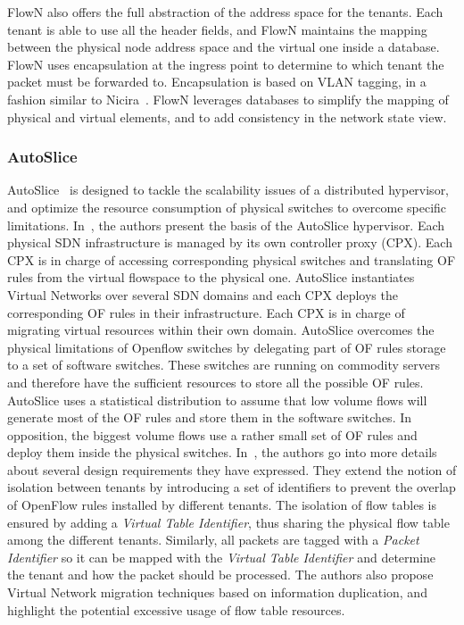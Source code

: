 FlowN also offers the full abstraction of the address space for the tenants.
Each tenant is able to use all the header fields, and FlowN maintains the mapping between the physical node address space and the virtual one inside a database. FlowN uses encapsulation at the ingress point to determine to which tenant the packet must be forwarded to. Encapsulation is based on VLAN tagging, in a fashion similar to Nicira~\cite{nicira}.   
FlowN leverages databases to simplify the mapping of physical and virtual elements, and to add consistency in the network state view.  


\subsubsection{AutoSlice}
AutoSlice~\cite{AutoSlice-Bozakov2012} is designed to tackle the scalability issues of a distributed hypervisor, and optimize the resource consumption of physical switches to overcome specific limitations.
In~\cite{AutoSlice-Bozakov2012}, the authors present the basis of the AutoSlice hypervisor.
Each physical SDN infrastructure is managed by its own controller proxy (CPX).
Each CPX is in charge of accessing corresponding physical switches and translating OF rules from the virtual flowspace to the physical one.
AutoSlice instantiates Virtual Networks over several SDN domains and each CPX deploys the corresponding OF rules in their infrastructure.
Each CPX is in charge of migrating virtual resources within their own domain.
AutoSlice overcomes the physical limitations of Openflow switches by delegating part of OF rules storage to a set of software switches.
These switches are running on commodity servers and therefore have the sufficient resources to store all the possible OF rules.
AutoSlice uses a statistical distribution to assume that low volume flows will generate most of the OF rules and store them in the software switches. In opposition, the biggest volume flows use a rather small set of OF rules and deploy them inside the physical switches.
In~\cite{AutoSlice2-Bozakov2014}, the authors go into more details about several design requirements they have expressed. They extend the notion of isolation between tenants by introducing a set of identifiers to prevent the overlap of OpenFlow rules installed by different tenants.
The isolation of flow tables is ensured by adding a \textit{Virtual Table Identifier}, thus sharing the physical flow table among the different tenants.
Similarly, all packets are tagged with a \textit{Packet Identifier} so it can be mapped with the \textit{Virtual Table Identifier} and determine the tenant and how the packet should be processed.
The authors also propose Virtual Network migration techniques based on information duplication, and highlight the potential excessive usage of flow table resources.

